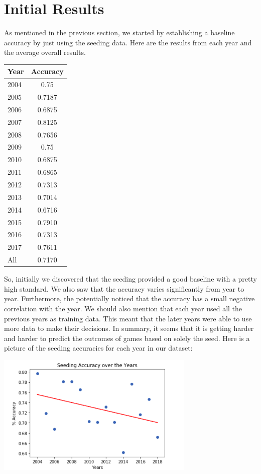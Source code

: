 \section{Initial Results}
As mentioned in the previous section, we started by establishing a baseline accuracy by just using the seeding data.
Here are the results from each year and the average overall results.

\vspace{0.5cm}
\begin{tabular}{lc}
  \toprule
  Year & Accuracy\\
  \midrule
  2004 & 0.75\\
  2005 & 0.7187\\
  2006 & 0.6875\\
  2007 & 0.8125\\
  2008 & 0.7656\\
  2009 & 0.75\\
  2010 & 0.6875\\
  2011 & 0.6865\\
  2012 & 0.7313\\
  2013 & 0.7014\\
  2014 & 0.6716\\
  2015 & 0.7910\\
  2016 & 0.7313\\
  2017 & 0.7611\\
  All & 0.7170\\
  \bottomrule
\end{tabular}
\vspace{0.5cm}

So, initially we discovered that the seeding provided a good baseline with a pretty high standard. 
We also saw that the accuracy varies significantly from year to year. 
Furthermore, the potentially noticed that the accuracy has a small negative correlation with the year. 
We should also mention that each year used all the previous years as training data.
This meant that the later years were able to use more data to make their decisions.
In summary, it seems that it is getting harder and harder to predict the outcomes of games based on solely the seed.
Here is a picture of the seeding accuracies for each year in our dataset:

\begin{center}
  \includegraphics[width=9.5cm]{SeedingAccuracies.png}
\end{center}

